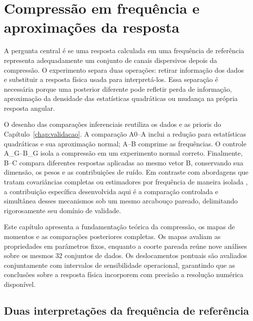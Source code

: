 \chapter[Resultados da compressão]{Compressão em frequência e aproximações da resposta}
\label{chap:compressao}

A pergunta central é se uma resposta calculada em uma frequência de referência
representa adequadamente um conjunto de canais dispersivos depois da compressão.
O experimento separa duas operações: retirar informação dos dados e substituir
a resposta física usada para interpretá-los. Essa separação é necessária porque
uma posterior diferente pode refletir perda de informação, aproximação da
densidade das estatísticas quadráticas ou mudança na própria resposta angular.

O desenho das comparações inferenciais reutiliza os dados e as prioris do
Capítulo~\ref{chap:validacao}. A comparação A0--A inclui a redução para
estatísticas quadráticas e sua aproximação normal; A--B comprime as frequências.
O controle A\_G--B\_G isola a compressão em um experimento normal correto.
Finalmente, B--C compara diferentes respostas aplicadas ao mesmo vetor B,
conservando sua dimensão, os pesos e as contribuições de ruído.
Em contraste com abordagens que tratam covariâncias completas ou estimadores
por frequência de maneira isolada \cite{gersbach2025pfos,gersbach2026anisotropic,han2026},
a contribuição específica desenvolvida aqui é a comparação controlada e simultânea
desses mecanismos sob um mesmo arcabouço pareado, delimitando rigorosamente seu domínio de validade.

Este capítulo apresenta a fundamentação teórica da compressão, os mapas de momentos
e as comparações posteriores completas. Os mapas avaliam as propriedades em parâmetros
fixos, enquanto a coorte pareada reúne nove análises sobre os mesmos 32 conjuntos de dados.
Os deslocamentos pontuais são avaliados conjuntamente com intervalos de sensibilidade
operacional, garantindo que as conclusões sobre a resposta física incorporem com
precisão a resolução numérica disponível.

\section{Duas interpretações da frequência de referência}

